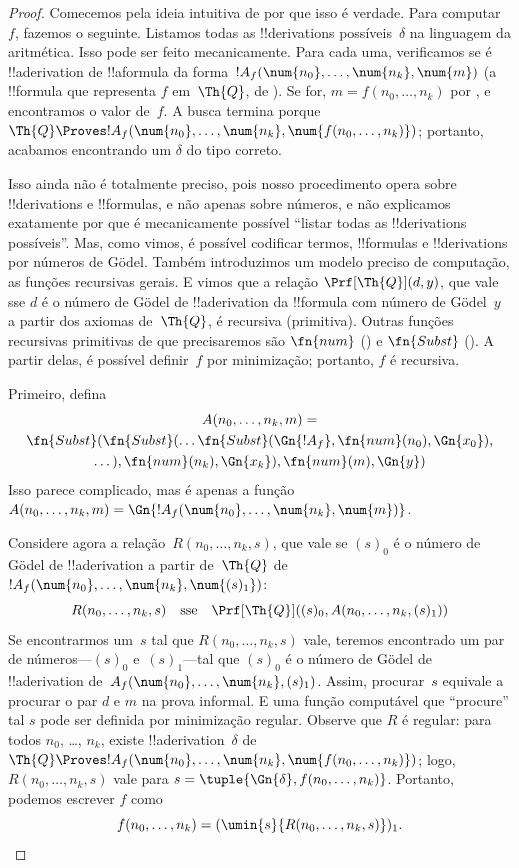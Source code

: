 \documentclass[../../../include/open-logic-section]{subfiles}
\begin{document}
\begin{proof}
Comecemos pela ideia intuitiva de por que isso é verdade. Para
computar~$f$, fazemos o seguinte. Listamos todas as !!{derivation}s
possíveis~$\delta$ na linguagem da aritmética. Isso pode ser feito
mecanicamente. Para cada uma, verificamos se é !!a{derivation} de
!!a{formula} da forma~$!A_f(\num{n_0}, \dots,
\num{n_k}, \num{m})$ (a !!{formula} que representa $f$ em~$\Th{Q}$,
de ). Se for, $m = f(n_0, \dots, n_k)$ por
, e encontramos o valor de~$f$. A busca termina porque
$\Th{Q} \Proves !A_f(\num{n_0}, \dots, \num{n_k},
\num{f(n_0, \dots, n_k)})$; portanto, acabamos encontrando um $\delta$
do tipo correto.

Isso ainda não é totalmente preciso, pois nosso procedimento opera
sobre !!{derivation}s e !!{formula}s, e não apenas sobre números, e
não explicamos exatamente por que é mecanicamente possível ``listar
todas as !!{derivation}s possíveis''. Mas, como vimos, é possível
codificar termos, !!{formula}s e !!{derivation}s por números de G\"odel.
Também introduzimos um modelo preciso de computação, as funções
recursivas gerais. E vimos que a relação $\Prf[\Th{Q}](d,y)$, que vale
sse $d$ é o número de G\"odel de !!a{derivation} da !!{formula} com
número de G\"odel~$y$ a partir dos axiomas de~$\Th{Q}$, é recursiva
(primitiva). Outras funções recursivas primitivas de que precisaremos
são $\fn{num}$ () e $\fn{Subst}$
(). A partir delas, é possível
definir~$f$ por minimização; portanto, $f$ é recursiva.

Primeiro, defina
\begin{multline*}
  A(n_0, \dots, n_k, m) = \\
  \fn{Subst}(\fn{Subst}(\dots\fn{Subst}(\Gn{!A_f}, \fn{num}(n_0), \Gn{x_0}),\\ \dots),
  \fn{num}(n_k),  \Gn{x_k}), \fn{num}(m), \Gn{y})
\end{multline*}
Isso parece complicado, mas é apenas a função $A(n_0, \dots, n_k,
m) = \Gn{!A_f(\num{n_0}, \dots, \num{n_k}, \num{m})}$.

Considere agora a relação~$R(n_0, \dots, n_k, s)$, que vale se
$(s)_0$ é o número de G\"odel de !!a{derivation} a partir de~$\Th{Q}$ de
$!A_f(\num{n_0}, \dots, \num{n_k}, \num{(s)_1})$:
\[
R(n_0, \dots, n_k, s) \quad\text{sse}\quad \Prf[\Th{Q}]((s)_0, A(n_0,
\dots, n_k, (s)_1))
\]
Se encontrarmos um~$s$ tal que $R(n_0, \dots, n_k, s)$ vale, teremos
encontrado um par de números---$(s)_0$ e~$(s)_1$---tal que $(s)_0$ é o
número de G\"odel de !!a{derivation} de~$A_f(\num{n_0}, \dots,
\num{n_k}, (s)_1)$. Assim, procurar~$s$ equivale a procurar o par $d$
e $m$ na prova informal. E uma função computável que ``procure'' tal
$s$ pode ser definida por minimização regular. Observe que $R$ é
regular: para todos $n_0$, \dots, $n_k$, existe !!a{derivation}~$\delta$
de $\Th{Q} \Proves !A_f(\num{n_0}, \dots,
\num{n_k}, \num{f(n_0, \dots, n_k)})$; logo,
$R(n_0, \dots, n_k, s)$ vale para
$s = \tuple{\Gn{\delta}, f(n_0, \dots, n_k)}$. Portanto, podemos
escrever $f$ como
\[
f(n_0,\dots,n_{k}) = (\umin{s}{R(n_0, \dots, n_k, s)})_1.
\]
\end{proof}
\end{document}
